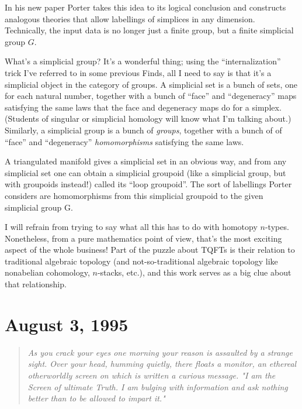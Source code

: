 \documentclass{article}
\begin{document}
In his new paper Porter takes this idea to its logical conclusion and
constructs analogous theories that allow labellings of simplices in any
dimension. Technically, the input data is no longer just a finite group,
but a finite simplicial group \(G\).

What's a simplicial group? It's a wonderful thing; using the
``internalization'' trick I've referred to in some previous Finds, all I
need to say is that it's a simplicial object in the category of groups.
A simplicial set is a bunch of sets, one for each natural number,
together with a bunch of ``face'' and ``degeneracy'' maps satisfying the
same laws that the face and degeneracy maps do for a simplex. (Students
of singular or simplicial homology will know what I'm talking about.)
Similarly, a simplicial group is a bunch of \emph{groups}, together with
a bunch of of ``face'' and ``degeneracy'' \emph{homomorphisms}
satisfying the same laws.

A triangulated manifold gives a simplicial set in an obvious way, and
from any simplicial set one can obtain a simplicial groupoid (like a
simplicial group, but with groupoids instead!) called its ``loop
groupoid''. The sort of labellings Porter considers are homomorphisms
from this simplicial groupoid to the given simplicial group G.

I will refrain from trying to say what all this has to do with homotopy
\(n\)-types. Nonetheless, from a pure mathematics point of view, that's
the most exciting aspect of the whole business! Part of the puzzle about
TQFTs is their relation to traditional algebraic topology (and
not-so-traditional algebraic topology like nonabelian cohomology,
\(n\)-stacks, etc.), and this work serves as a big clue about that
relationship.



\hypertarget{week59}{%
\section{August 3, 1995}\label{week59}}

\begin{quote}
\emph{As you crack your eyes one morning your reason is assaulted by a}
\emph{strange sight. Over your head, humming quietly, there floats a}
\emph{monitor, an ethereal otherworldly screen on which is written a
curious} \emph{message. "I am the Screen of ultimate Truth. I am bulging
with} \emph{information and ask nothing better than to be allowed to
impart it."}
\end{quote}
\end{document}
